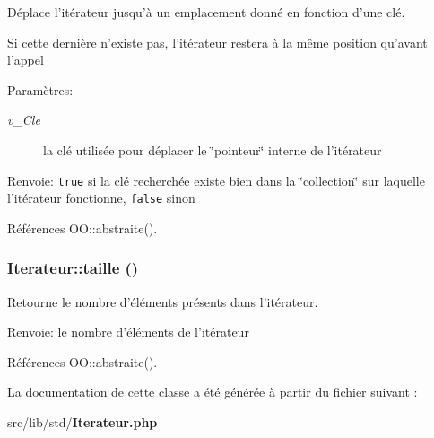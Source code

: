 Déplace l'itérateur jusqu'à un emplacement donné en fonction d'une clé. 

Si cette dernière n'existe pas, l'itérateur restera à la même position qu'avant l'appel

\begin{Desc}
\item[Paramètres:]
\begin{description}
\item[{\em v\_\-Cle}]la clé utilisée pour déplacer le \char`\"{}pointeur\char`\"{} interne de l'itérateur\end{description}
\end{Desc}
\begin{Desc}
\item[Renvoie:]{\tt true} si la clé recherchée existe bien dans la \char`\"{}collection\char`\"{} sur laquelle l'itérateur fonctionne, {\tt false} sinon \end{Desc}


Références OO::abstraite().
\subsubsection{\setlength{\rightskip}{0pt plus 5cm}Iterateur::taille ()}\label{class_iterateur_40a496bef151a677b180e7805f106acd}


Retourne le nombre d'éléments présents dans l'itérateur. 

\begin{Desc}
\item[Renvoie:]le nombre d'éléments de l'itérateur \end{Desc}


Références OO::abstraite().

La documentation de cette classe a été générée à partir du fichier suivant :\begin{CompactItemize}
\item 
src/lib/std/{\bf Iterateur.php}\end{CompactItemize}
